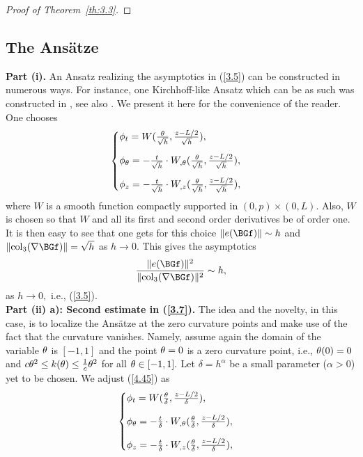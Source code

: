 \begin{proof}[Proof of Theorem~{\ref{th:3.3}}]
\end{proof}



\subsection{The Ans\"atze}

\noindent \textbf{Part (i).} An Ansatz realizing the asymptotics in (\ref{3.5}) can be constructed in numerous ways. For instance, one Kirchhoff-like Ansatz which can be as such was constructed in \cite{bib:Harutyunyan.2}, see also \cite{bib:Harutyunyan.3}. We present it here for the convenience of the reader. One chooses 
\begin{equation}
\label{4.45}
\begin{cases}
\phi_t=W(\frac{\theta}{\sqrt{h}},\frac{z-L/2}{\sqrt{h}}),\\[10pt]
\phi_\theta=-\frac{t}{\sqrt{h}} \cdot W_{,\theta}(\frac{\theta}{\sqrt{h}},\frac{z-L/2}{\sqrt{h}}),\\[10pt]
\phi_z=-\frac{t}{\sqrt{h}} \cdot W_{,z}(\frac{\theta}{\sqrt{h}},\frac{z-L/2}{\sqrt{h}}),
\end{cases}
\end{equation}
where $W$ is a smooth function compactly supported in $(0,p)\times (0,L).$ Also, $W$ is chosen so that $W$ and all its first and second order derivatives be of order one. It is then easy to see that one gets for this choice $\|e(\BGf)\|\sim h$ and $\|\mathrm{col}_3(\nabla\BGf)\|=\sqrt{h}$ as $h\to 0.$ This gives the asymptotics 
$$\frac{\|e(\BGf)\|^2}{\|\mathrm{col}_3(\nabla\BGf)\|^2}\sim h,$$
as $h\to 0,$ i.e., (\ref{3.5}).\\
\noindent \textbf{Part (ii) a): Second estimate in (\ref{3.7}).} The idea and the novelty, in this case, is to localize the Ans\"atze at the zero curvature points and make use of the fact that the curvature vanishes. Namely, assume again the domain of the variable $\theta$ is $[-1,1]$ and the point $\theta=0$ is a zero curvature point, i.e., 
$\theta(0)=0$ and $c\theta^2\leq k(\theta)\leq \frac{1}{c}\theta^2$ for all $\theta\in [-1,1].$ Let $\delta=h^\alpha$ be a small parameter ($\alpha>0$) yet to be chosen. We adjust (\ref{4.45}) as 
\begin{equation}
\label{4.46}
\begin{cases}
\phi_t=W(\frac{\theta}{\delta},\frac{z-L/2}{\delta}),\\[10pt]
\phi_\theta=-\frac{t}{\delta} \cdot W_{,\theta}(\frac{\theta}{\delta},\frac{z-L/2}{\delta}),\\[10pt]
\phi_z=-\frac{t}{\delta}\cdot W_{,z}(\frac{\theta}{\delta},\frac{z-L/2}{\delta}),
\end{cases}
\end{equation}
